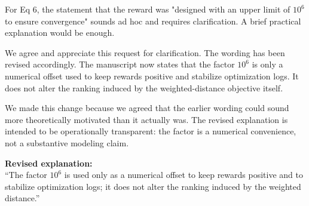 \begin{ReviewerComment}
For Eq 6, the statement that the reward was "designed with an upper limit of $10^6$ to ensure convergence" sounds ad hoc and requires clarification. A brief practical explanation would be enough.
\end{ReviewerComment}
%
\begin{Answer}
We agree and appreciate this request for clarification. The wording has been revised accordingly. The manuscript now states that the factor $10^6$ is only a numerical offset used to keep rewards positive and stabilize optimization logs. It does not alter the ranking induced by the weighted-distance objective itself.

We made this change because we agreed that the earlier wording could sound more theoretically motivated than it actually was. The revised explanation is intended to be operationally transparent: the factor is a numerical convenience, not a substantive modeling claim.
\end{Answer}
\begin{RevisionExcerpt}
\noindent\textbf{Revised explanation:}\\
``The factor $10^6$ is used only as a numerical offset to keep rewards positive and to stabilize optimization logs; it does not alter the ranking induced by the weighted distance.''
\end{RevisionExcerpt}

